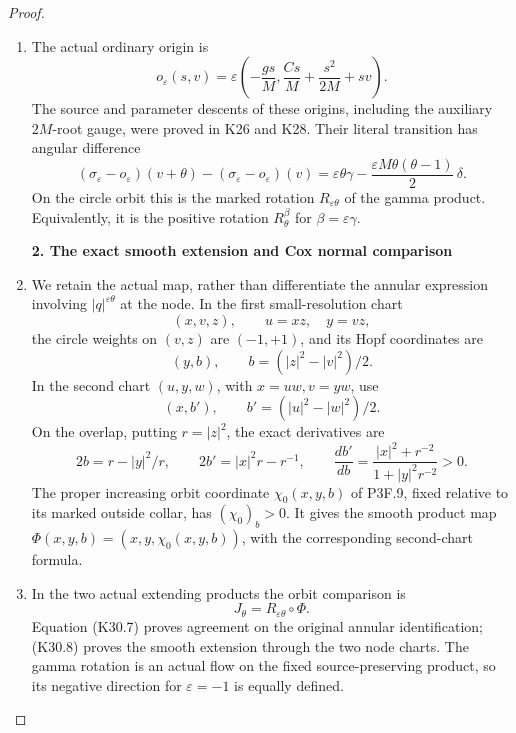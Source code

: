 \begin{proof}
\begin{enumerate}[label=\arabic*.]
\item The actual ordinary origin is
\[
 o_\varepsilon(s,v)
       =\varepsilon\left(
          -\frac{gs}{M},
          \frac{Cs}{M}+\frac{s^2}{2M}+sv\right).
 \tag{K30.6}
\]
The source and parameter descents of these origins, including
the auxiliary \(2M\)-root gauge, were proved in K26 and K28.
Their literal transition has angular difference
\[
 (\sigma_\varepsilon-o_\varepsilon)(v+\theta)
       -(\sigma_\varepsilon-o_\varepsilon)(v)
   =\varepsilon\theta\gamma
       -\frac{\varepsilon M\theta(\theta-1)}2\,\delta .
 \tag{K30.7}
\]
On the circle orbit this is the marked rotation
\(R_{\varepsilon\theta}\) of the gamma product. Equivalently,
it is the positive rotation \(R^\beta_\theta\) for
\(\beta=\varepsilon\gamma\).

\par

\medskip\noindent\textbf{2. The exact smooth extension and Cox normal comparison}

\par\nobreak

\item We retain the actual map, rather than differentiate the annular
expression involving \(|q|^{\varepsilon\theta}\) at the node.
In the first small-resolution chart
\[
 (x,v,z),\qquad u=xz,\quad y=vz,
\]
the circle weights on \((v,z)\) are \((-1,+1)\), and its
Hopf coordinates are
\[
                (y,b),\qquad b=(|z|^2-|v|^2)/2.
\]
In the second chart \((u,y,w)\), with \(x=uw,v=yw\), use
\[
                (x,b'),\qquad b'=(|u|^2-|w|^2)/2.
\]
On the overlap, putting \(r=|z|^2\), the exact derivatives are
\[
 2b=r-|y|^2/r,\qquad
 2b'=|x|^2r-r^{-1},\qquad
 \frac{db'}{db}
   =\frac{|x|^2+r^{-2}}{1+|y|^2r^{-2}}>0.
 \tag{K30.8}
\]
The proper increasing orbit coordinate \(\chi_0(x,y,b)\)
of P3F.9, fixed relative to its marked outside collar,
has \((\chi_0)_b>0\). It gives the smooth product map
\(\Phi(x,y,b)=(x,y,\chi_0(x,y,b))\), with the corresponding
second-chart formula.

\item In the two actual extending products the orbit comparison is
\[
                       J_\theta=R_{\varepsilon\theta}\circ\Phi.
 \tag{K30.9}
\]
Equation (K30.7) proves agreement on the original annular
identification; (K30.8) proves the smooth extension through the
two node charts. The gamma rotation is an actual flow on the
fixed source-preserving product, so its negative direction for
\(\varepsilon=-1\) is equally defined.


\end{enumerate}
\end{proof}
